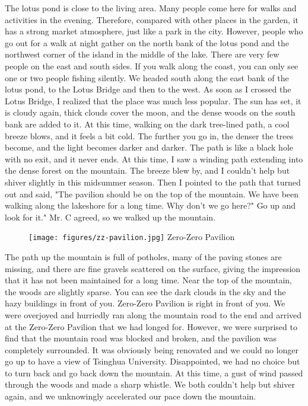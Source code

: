 The lotus pond is close to the living area. Many people come here for walks and
activities in the evening. Therefore, compared with other places in the garden,
it has a strong market atmosphere, just like a park in the city.  However,
people who go out for a walk at night gather on the north bank of the lotus
pond and the northwest corner of the island in the middle of the lake. There
are very few people on the east and south sides. If you walk along the coast,
you can only see one or two people fishing silently.  We headed south along the
east bank of the lotus pond, to the Lotus Bridge and then to the west. As soon
as I crossed the Lotus Bridge, I realized that the place was much less popular.
The sun has set, it is cloudy again, thick clouds cover the moon, and the dense
woods on the south bank are added to it. At this time, walking on the dark
tree-lined path, a cool breeze blows, and it feels a bit cold.  The further you
go in, the denser the trees become, and the light becomes darker and darker.
The path is like a black hole with no exit, and it never ends. At this time, I
saw a winding path extending into the dense forest on the mountain.  The breeze
blew by, and I couldn't help but shiver slightly in this midsummer season. Then
I pointed to the path that turned out and said, "The pavilion should be on the
top of the mountain. We have been walking along the lakeshore for a long time.
Why don't we go here?" Go up and look for it." Mr. C agreed, so we walked up
the mountain.

\begin{figure}[!h]
	\centering
	\texttt{[image: figures/zz-pavilion.jpg]}
	Zero-Zero Pavilion
\end{figure}

The path up the mountain is full of potholes, many of the paving stones are
missing, and there are fine gravels scattered on the surface, giving the
impression that it has not been maintained for a long time.  Near the top of
the mountain, the woods are slightly sparse. You can see the dark clouds in the
sky and the hazy buildings in front of you. Zero-Zero Pavilion is right in front
of you.  We were overjoyed and hurriedly ran along the mountain road to the end
and arrived at the Zero-Zero Pavilion that we had longed for. However, we were
surprised to find that the mountain road was blocked and broken, and the
pavilion was completely surrounded. It was obviously being renovated and we
could no longer go up to have a view of Tsinghua University. Disappointed, we
had no choice but to turn back and go back down the mountain.  At this time, a
gust of wind passed through the woods and made a sharp whistle. We both
couldn't help but shiver again, and we unknowingly accelerated our pace down
the mountain.

